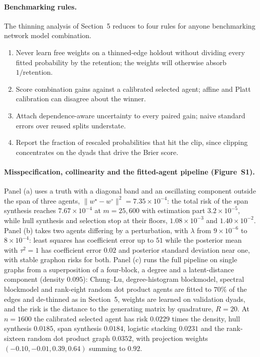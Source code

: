 \documentclass[12pt]{article}
\newcommand{\norm}[1]{\|#1\|}
\newcommand{\wstar}{w^{\star}}
\newcommand{\wproj}{w^{\circ}}
\begin{document}
\paragraph{Benchmarking rules.}
The thinning analysis of Section~5 reduces to four rules for anyone benchmarking network model combination.
\begin{enumerate}
\item Never learn free weights on a thinned-edge holdout without dividing every fitted probability by the retention; the weights will otherwise absorb $1/\text{retention}$.
\item Score combination gains against a calibrated selected agent; affine and Platt calibration can disagree about the winner.
\item Attach dependence-aware uncertainty to every paired gain; naive standard errors over reused splits understate.
\item Report the fraction of rescaled probabilities that hit the clip, since clipping concentrates on the dyads that drive the Brier score.
\end{enumerate}

\paragraph{Misspecification, collinearity and the fitted-agent pipeline (Figure~S1).}
Panel (a) uses a truth with a diagonal band and an oscillating component outside the span of three agents, $\norm{\wstar-\wproj}^2=7.35\times10^{-4}$: the total risk of the span synthesis reaches $7.67\times10^{-4}$ at $m=25{,}600$ with estimation part $3.2\times10^{-5}$, while hull synthesis and selection stop at their floors, $1.08\times10^{-3}$ and $1.40\times10^{-2}$. Panel (b) takes two agents differing by a perturbation, with $\lambda$ from $9\times10^{-6}$ to $8\times10^{-4}$: least squares has coefficient error up to $51$ while the posterior mean with $\tau^2=1$ has coefficient error $0.02$ and posterior standard deviation near one, with stable graphon risks for both. Panel (c) runs the full pipeline on single graphs from a superposition of a four-block, a degree and a latent-distance component (density $0.095$): Chung--Lu, degree-histogram blockmodel, spectral blockmodel and rank-eight random dot product agents are fitted to $70\%$ of the edges and de-thinned as in Section~5, weights are learned on validation dyads, and the risk is the distance to the generating matrix by quadrature, $R=20$. At $n=1600$ the calibrated selected agent has risk $0.0229$ times the density, hull synthesis $0.0185$, span synthesis $0.0184$, logistic stacking $0.0231$ and the rank-sixteen random dot product graph $0.0352$, with projection weights $(-0.10,-0.01,0.39,0.64)$ summing to $0.92$.
\end{document}
